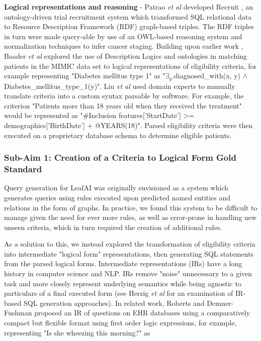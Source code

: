 \documentclass[../main.tex]{subfiles}
\begin{document}
\textbf{Logical representations and reasoning} - Patrao \textit{et al} developed Recruit \cite{patrao2015recruit}, an ontology-driven trial recruitment system which transformed SQL relational data to Resource Description Framework (RDF) graph-based triples. The RDF triples in turn were made query-able by use of an OWL-based reasoning system \cite{owl} and normalization techniques to infer cancer staging. Building upon earlier work \cite{patel2007matching, tu2009ergo, huang2013semanticct}, Baader \textit{et al} \cite{baader2018patient} explored the use of Description Logics and ontologies in matching patients in the MIMIC data set to logical representations of eligibility criteria, for example representing "Diabetes mellitus type 1" as "$\exists_y$.diagnosed\_with(x, y) $\wedge$ Diabetes\_mellitus\_type\_1(y)". Liu \textit{et al} \cite{liu2021evaluating} used domain experts to manually translate criteria into a custom syntax parsable by software. For example, the criterion "Patients more than 18 years old when they received the treatment" would be represented as "\#Inclusion features['StartDate'] >= demographics['BirthDate'] + @YEARS(18)". Parsed eligibility criteria were then executed on a proprietary database schema to determine eligible patients.

\subsubsection{Sub-Aim 1: Creation of a Criteria to Logical Form Gold Standard}

Query generation for LeafAI was originally envisioned as a system which generates queries using rules executed upon predicted named entities and relations in the form of graphs. In practice, we found this system to be difficult to manage given the need for ever more rules, as well as error-prone in handling new unseen criteria, which in turn required the creation of additional rules.

As a solution to this, we instead explored the transformation of  eligibility criteria into intermediate "logical form" representations, then generating SQL statements from the parsed logical forms. Intermediate representations (IRs) have a long history in computer science and NLP. IRs remove "noise" unnecessary to a given task and more closely represent underlying semantics while being agnostic to particulars of a final executed form (see Herzig \textit{et al} \cite{herzig2021unlocking} for an examination of IR-based SQL generation approaches). In related work, Roberts and Demner-Fushman \cite{roberts2016annotating} proposed an IR of questions on EHR databases using a comparatively compact but flexible format using first order logic expressions, for example, representing "Is she wheezing this morning?" as
\end{document}
